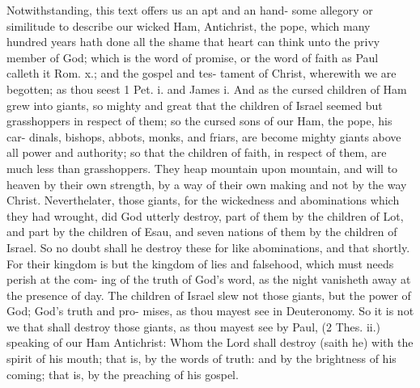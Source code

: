 \documentclass{custom}
\begin{document}
Notwithstanding, this text offers us an apt and an hand- 
some allegory or similitude to describe our wicked Ham, 
Antichrist, the pope, which many hundred years hath done 
all the shame that heart can think unto the privy member 
of God; which is the word of promise, or the word of 
faith as Paul calleth it Rom. x.; and the gospel and tes- 
tament of Christ, wherewith we are begotten; as thou 
seest 1 Pet. i. and James i. And as the cursed children 
of Ham grew into giants, so mighty and great that the 
children of Israel seemed but grasshoppers in respect of 
them; so the cursed sons of our Ham, the pope, his car- 
dinals, bishops, abbots, monks, and friars, are become 
mighty giants above all power and authority; so that the 
children of faith, in respect of them, are much less than 
grasshoppers. They heap mountain upon mountain, and 
will to heaven by their own strength, by a way of their own 
making and not by the way Christ. Neverthelater, 
those giants, for the wickedness and abominations which 
they had wrought, did God utterly destroy, part of them 
by the children of Lot, and part by the children of Esau, 
and seven nations of them by the children of Israel. So 
no doubt shall he destroy these for like abominations, and 
that shortly. For their kingdom is but the kingdom of 
lies and falsehood, which must needs perish at the com- 
ing of the truth of God's word, as the night vanisheth away 
at the presence of day. The children of Israel slew not 
those giants, but the power of God; God's truth and pro- 
mises, as thou mayest see in Deuteronomy. So it is not we 
that shall destroy those giants, as thou mayest see by Paul, 
(2 Thes. ii.) speaking of our Ham Antichrist: Whom the 
Lord shall destroy (saith he) with the spirit of his mouth; 
that is, by the words of truth: and by the brightness of his 
coming; that is, by the preaching of his gospel. 
\end{document}
